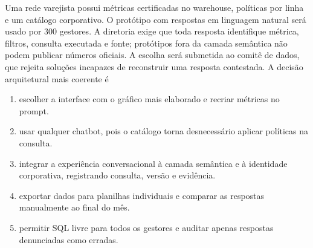 \documentclass[12pt,a4paper]{article}
\begin{document}
\TextoBase
Uma rede varejista possui métricas certificadas no warehouse, políticas por linha e um catálogo corporativo. O protótipo com respostas em linguagem natural será usado por 300 gestores. A diretoria exige que toda resposta identifique métrica, filtros, consulta executada e fonte; protótipos fora da camada semântica não podem publicar números oficiais.
A escolha será submetida ao comitê de dados, que rejeita soluções incapazes de reconstruir uma resposta contestada.
\FonteDidatica
\Comando A decisão arquitetural mais coerente é
\begin{enumerate}[label=\Alph*)]
  \item escolher a interface com o gráfico mais elaborado e recriar métricas no prompt.
  \item usar qualquer chatbot, pois o catálogo torna desnecessário aplicar políticas na consulta.
  \item integrar a experiência conversacional à camada semântica e à identidade corporativa, registrando consulta, versão e evidência.
  \item exportar dados para planilhas individuais e comparar as respostas manualmente ao final do mês.
  \item permitir SQL livre para todos os gestores e auditar apenas respostas denunciadas como erradas.
\end{enumerate}
\end{document}
